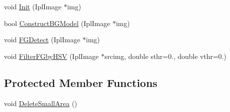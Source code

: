 \begin{DoxyCompactItemize}
\item 
void \hyperlink{classyx_f_g_detect_m_p_base_r_g_b_a56a2135aeabf39b7cd995db03943c052}{Init} (Ipl\+Image $\ast$img)
\item 
bool \hyperlink{classyx_f_g_detect_m_p_base_r_g_b_a535d1d9577b8c6443f3b646c55112784}{Construct\+B\+G\+Model} (Ipl\+Image $\ast$img)
\item 
void \hyperlink{classyx_f_g_detect_m_p_base_r_g_b_a7a1c923138174ac41ec290e4650755df}{F\+G\+Detect} (Ipl\+Image $\ast$img)
\item 
void \hyperlink{classyx_f_g_detect_m_p_base_r_g_b_a10d50c94147c4cb2485016649f90b06b}{Filter\+F\+Gby\+H\+S\+V} (Ipl\+Image $\ast$srcimg, double sthr=0., double vthr=0.)
\end{DoxyCompactItemize}
\subsection*{Protected Member Functions}
\begin{DoxyCompactItemize}
\item 
void \hyperlink{classyx_f_g_detect_m_p_base_r_g_b_a8d56d234b5fb6f0201478e9c53fb3fa2}{Delete\+Small\+Area} ()
\end{DoxyCompactItemize}


